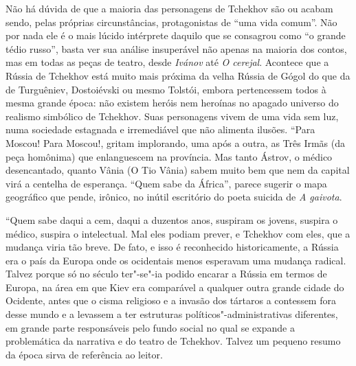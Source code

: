Não há dúvida de que a maioria das personagens de Tchekhov são ou acabam
sendo, pelas próprias circunstâncias, protagonistas de ``uma vida
comum''. Não por nada ele é o mais lúcido intérprete daquilo que se
consagrou como ``o grande tédio russo'', basta ver sua análise
insuperável não apenas na maioria dos contos, mas em todas as peças de
teatro, desde \emph{Ivánov} até \emph{O cerejal}. Acontece que a Rússia
de Tchekhov está muito mais próxima da velha Rússia de Gógol do que da
de Turguêniev, Dostoiévski ou mesmo Tolstói, embora pertencessem todos à
mesma grande época: não existem heróis nem heroínas no apagado universo
do realismo simbólico de Tchekhov. Suas personagens vivem de uma vida
sem luz, numa sociedade estagnada e irremediável que não alimenta
ilusões. ``Para Moscou! Para Moscou!, gritam implorando, uma após a
outra, as Três Irmãs (da peça homônima) que enlanguescem na província.
Mas tanto Ástrov, o médico desencantado, quanto Vânia (O Tio Vânia)
sabem muito bem que nem da capital virá a centelha de esperança. ``Quem
sabe da África'', parece sugerir o mapa geográfico que pende, irônico,
no inútil escritório do poeta suicida de \emph{A gaivota}.

``Quem sabe daqui a cem, daqui a duzentos anos, suspiram os jovens,
suspira o médico, suspira o intelectual. Mal eles podiam prever, e
Tchekhov com eles, que a mudança viria tão breve. De fato, e isso é
reconhecido historicamente, a Rússia era o país da Europa onde os
ocidentais menos esperavam uma mudança radical. Talvez porque só no
século  ter"-se"-ia podido encarar a Rússia em termos de Europa, na área
em que Kiev era comparável a qualquer outra grande cidade do Ocidente,
antes que o cisma religioso e a invasão dos tártaros a contessem fora
desse mundo e a levassem a ter estruturas políticos"-administrativas
diferentes, em grande parte responsáveis pelo fundo social no qual se
expande a problemática da narrativa e do teatro de Tchekhov. Talvez um
pequeno resumo da época sirva de referência ao leitor.

